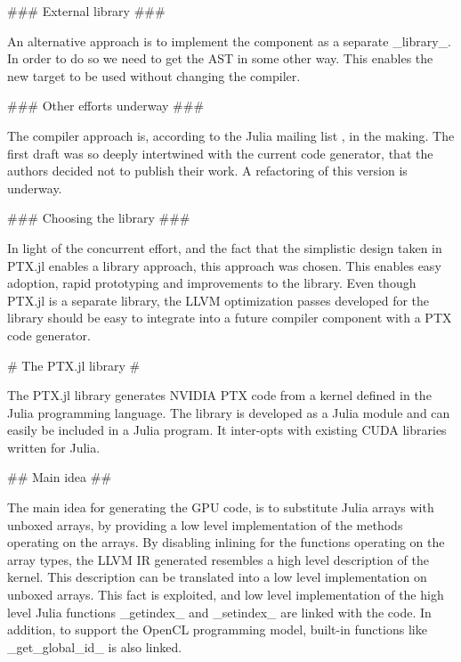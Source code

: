 \begin{markdown}
### External library ###

An alternative approach is to implement the component as a separate
_library_. In order to do so we need to get the AST in some other
way. This enables the new target to be used without changing the
compiler.

### Other efforts underway ###

The compiler approach is, according to the Julia mailing list
\cite{julia-dev}, in the making. The first draft was so deeply
intertwined with the current code generator, that the authors decided
not to publish their work. A refactoring of this version is underway.

### Choosing the library ###

In light of the concurrent effort, and the fact that the simplistic
design taken in PTX.jl enables a library approach, this approach was
chosen. This enables easy adoption, rapid prototyping and improvements
to the library. Even though PTX.jl is a separate library, the LLVM
optimization passes developed for the library should be easy to
integrate into a future compiler component with a PTX code generator.

# The PTX.jl library #
\label{sec:meth:ptx}
  
The PTX.jl library generates NVIDIA PTX code from a kernel defined in
the Julia programming language. The library is developed as a Julia
module and can easily be included in a Julia program. It inter-opts
with existing CUDA libraries written for Julia. 

## Main idea ##
\label{sec:meth:idea}

The main idea for generating the GPU code, is to substitute Julia
arrays with unboxed arrays, by providing a low level implementation of
the methods operating on the arrays. By disabling inlining for the
functions operating on the array types, the LLVM IR generated
resembles a high level description of the kernel. This description can
be translated into a low level implementation on unboxed arrays. This
fact is exploited, and low level implementation of the high level Julia
functions _getindex_ and _setindex_ are linked with the code. In
addition, to support the OpenCL programming model, built-in functions
like _get_global_id_ is also linked.


\end{markdown}

